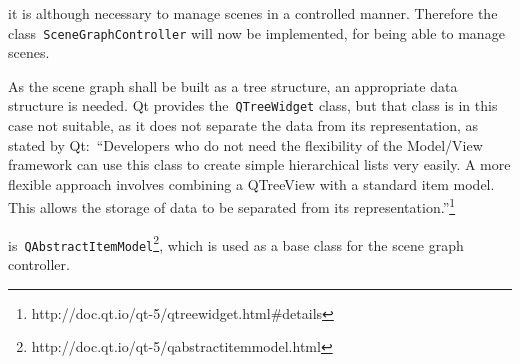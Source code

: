 \documentclass[%
    a4paper,    %
    justified,  %
    nobib,      %
    openany     %
]{tufte-book}
\begin{document}
 it is although necessary to manage
scenes in a controlled manner. Therefore the class~\verb=SceneGraphController=
will now be implemented, for being able to manage scenes.

As the scene graph shall be built as a tree structure, an appropriate data
structure is needed. Qt provides the~\verb=QTreeWidget= class, but that
class is in this case not suitable, as it does not separate the data from its
representation, as stated by Qt:~\enquote{Developers who do not need the flexibility of
the Model/View framework can use this class to create simple hierarchical lists
very easily. A more flexible approach involves combining a QTreeView with a
standard item model. This allows the storage of data to be separated from its
representation.}\footnote{http://doc.qt.io/qt-5/qtreewidget.html\#details}

is~\verb=QAbstractItemModel=\footnote{\label{footnote:qabstractitemmodel}
http://doc.qt.io/qt-5/qabstractitemmodel.html}, which is used as a base class
for the scene graph controller.
\end{document}
